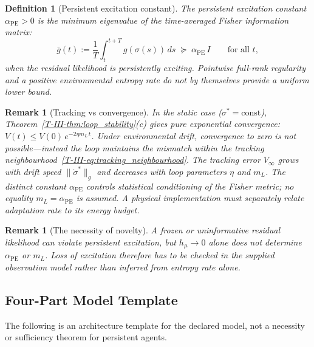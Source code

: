 \documentclass[12pt,a4paper,openany]{book}
\newtheorem{definition}[theorem]{Definition}
\newtheorem{remark}[theorem]{Remark}
\begin{document}
\begin{definition}[Persistent excitation constant]
\label{T-III-def:PE_constant}
The \emph{persistent excitation constant} $\alpha_{\mathrm{PE}}>0$ is
the minimum eigenvalue of the time-averaged Fisher
information matrix:
\begin{equation}
\label{T-III-eq:PE_constant}
\bar{g}(t)
:= \frac{1}{T}\int_t^{t+T}
g(\sigma(s))\,ds
\;\succeq\; \alpha_{\mathrm{PE}}\,I
\qquad\text{for all } t,
\end{equation}
when the residual likelihood is persistently exciting.  Pointwise
full-rank regularity and a positive environmental entropy rate do not
by themselves provide a uniform lower bound.
\end{definition}

\begin{remark}[Tracking vs convergence]
\label{T-III-rem:tracking}
In the static case ($\sigma^* = \mathrm{const}$),
Theorem~\ref{T-III-thm:loop_stability}(c) gives pure exponential
convergence:
$V(t) \leq V(0)\,e^{-2\eta m_L\,t}$.
Under environmental drift, convergence to zero is
\emph{not} possible---instead the loop maintains the
mismatch within the tracking
neighbourhood~\eqref{T-III-eq:tracking_neighbourhood}.
The tracking error $V_\infty$ grows with drift speed
$\|\dot{\sigma}^*\|_g$ and decreases with loop parameters
$\eta$ and $m_L$.  The distinct constant
$\alpha_{\mathrm{PE}}$ controls statistical conditioning of the Fisher
metric; no equality $m_L=\alpha_{\mathrm{PE}}$ is assumed.  A physical
implementation must separately relate adaptation rate to its energy
budget.
\end{remark}

\begin{remark}[The necessity of novelty]
\label{T-III-rem:novelty}
A frozen or uninformative residual likelihood can violate persistent
excitation, but $h_\mu\to0$ alone does not determine
$\alpha_{\mathrm{PE}}$ or $m_L$.  Loss of excitation therefore has to
be checked in the supplied observation model rather than inferred from
entropy rate alone.
\end{remark}

\subsection{Four-Part Model Template}
\label{T-III-subsec:four_part}

The following is an architecture template for the declared model, not a
necessity or sufficiency theorem for persistent agents.
\end{document}
